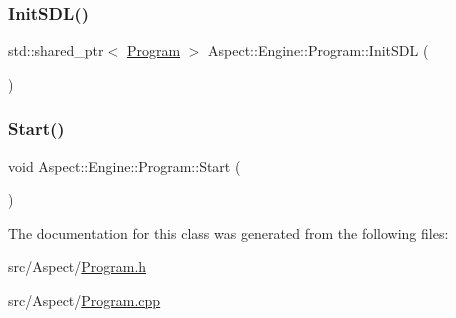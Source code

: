\subsubsection{\texorpdfstring{Init\+S\+D\+L()}{InitSDL()}}
{\footnotesize\ttfamily std\+::shared\+\_\+ptr$<$ \mbox{\hyperlink{class_aspect_1_1_engine_1_1_program}{Program}} $>$ Aspect\+::\+Engine\+::\+Program\+::\+Init\+S\+DL (\begin{DoxyParamCaption}{ }\end{DoxyParamCaption})\hspace{0.3cm}{\ttfamily [static]}}

\mbox{\label{class_aspect_1_1_engine_1_1_program_aee19a120d828c74bd868a62f33a61e57}} 
\subsubsection{\texorpdfstring{Start()}{Start()}}
{\footnotesize\ttfamily void Aspect\+::\+Engine\+::\+Program\+::\+Start (\begin{DoxyParamCaption}{ }\end{DoxyParamCaption})}



The documentation for this class was generated from the following files\+:\begin{DoxyCompactItemize}
\item 
src/\+Aspect/\mbox{\hyperlink{_program_8h}{Program.\+h}}\item 
src/\+Aspect/\mbox{\hyperlink{_program_8cpp}{Program.\+cpp}}\end{DoxyCompactItemize}
